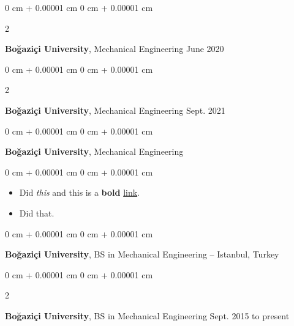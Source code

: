 \documentclass[10pt, letterpaper]{article}
\newenvironment{highlights}{
    \begin{itemize}[
        topsep=0.10 cm,
        parsep=0.10 cm,
        partopsep=0pt,
        itemsep=0pt,
        leftmargin=0 cm + 10pt
    ]
}{
    \end{itemize}
        
    \vspace{-0.10cm}
} %
\newenvironment{onecolentry}{
    \begin{adjustwidth}{
        0 cm + 0.00001 cm
    }{
        0 cm + 0.00001 cm
    }
}{
    \end{adjustwidth}
} %
\newenvironment{twocolentry}[2][]{
    \onecolentry
    \def\secondColumn{#2}
    \setcolumnwidth{\fill, 4.1 cm}
    \begin{paracol}{2}
}{
    \switchcolumn \raggedleft \secondColumn
    \end{paracol}
    \endonecolentry
} %
\begin{document}
        \vspace{0.10 cm}


        \vspace{0.15 cm}

        \begin{twocolentry}{
            June 2020
        }
            \textbf{Boğaziçi University}, Mechanical Engineering\end{twocolentry}

        \vspace{0.10 cm}


        \vspace{0.15 cm}

        \begin{twocolentry}{
            Sept. 2021
        }
            \textbf{Boğaziçi University}, Mechanical Engineering\end{twocolentry}

        \vspace{0.10 cm}


        \vspace{0.15 cm}

        \begin{onecolentry}
            \textbf{Boğaziçi University}, Mechanical Engineering\end{onecolentry}

        \vspace{0.10 cm}
        \begin{onecolentry}
            \begin{highlights}
                \item Did \textit{this} and this is a \textbf{bold} \href{https://example.com}{link}.
                \item Did that.
            \end{highlights}
        \end{onecolentry}


        \vspace{0.15 cm}

        \begin{onecolentry}
            \textbf{Boğaziçi University}, BS in Mechanical Engineering -- Istanbul, Turkey\end{onecolentry}

        \vspace{0.10 cm}


        \vspace{0.15 cm}

        \begin{twocolentry}{
            Sept. 2015 to present
        }
            \textbf{Boğaziçi University}, BS in Mechanical Engineering\end{twocolentry}
\end{document}
